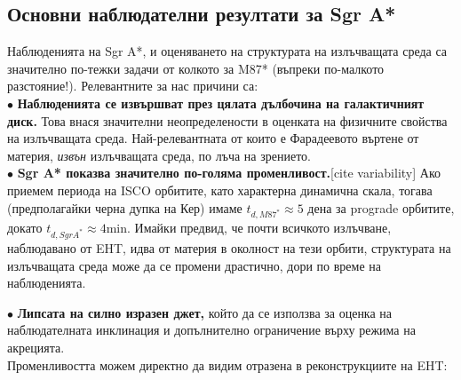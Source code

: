 \subsection{Основни наблюдателни резултати за Sgr A*}

Наблюденията на Sgr A*, и оценяването на структурата на излъчващата среда са значително по-тежки задачи от колкото за M87* (въпреки по-малкото разстояние!). Релевантните за нас причини са:\\\newline
$\bullet$ \textbf{Наблюденията се извършват през цялата дълбочина на галактичният диск.} Това внася значителни неопределености в оценката на физичните свойства на излъчващата среда. Най-релевантната от които е Фарадеевото въртене от материя, \emph{извън} излъчващата среда, по лъча на зрението.\\\newline
$\bullet$ \textbf{Sgr A* показва значително по-голяма променливост.}[cite variability] Ако приемем периода на ISCO орбитите, като характерна динамична скала, тогава (предполагайки черна дупка на Кер) имаме $t_{d,M87^*} \approx 5 $ дена за prograde орбитите, докато $t_{d,Sgr A^*}\approx 4 \text{min}$. Имайки предвид, че почти всичкото излъчване, наблюдавано от EHT, идва от материя в околност на тези орбити, структурата на излъчващата среда може да се промени драстично, дори по време на наблюденията. \newpage

\noindent$\bullet$ \textbf{Липсата на силно изразен джет,} който да се използва за оценка на наблюдателната инклинация и допълнително ограничение върху режима на акрецията.\\\newline
Променливостта можем директно да видим отразена в реконструкциите на EHT:\\

